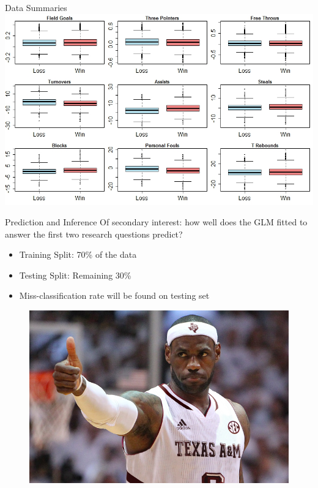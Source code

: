 \documentclass{beamer}
\begin{document}
\begin{frame}{Data Summaries}
	\centering
	\includegraphics[height=.85\textheight]{toomanyboxes.jpeg}
\end{frame}

\begin{frame}{Prediction and Inference} 
Of secondary interest: how well does the GLM fitted to answer the first two research questions predict?
\begin{itemize}
	\item Training Split: 70\% of the data
	\item Testing Split: Remaining 30\%
	\item Miss-classification rate will be found on testing set
\end{itemize}
\begin{figure}[r]
	\includegraphics[height = .5\textheight]{fakelebron.png}
\end{figure}
\end{frame}
\end{document}
